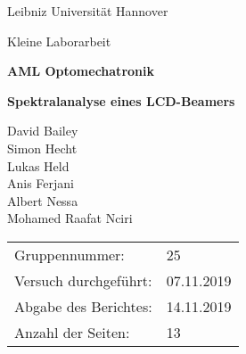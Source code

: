 \begin{titlepage}
	\centering
	{Leibniz Universität Hannover\par}
	{\large Kleine Laborarbeit\par}	

	\vspace{4.5cm}	
	
	{\huge \bf AML Optomechatronik \par}
	{\Huge \bf Spektralanalyse eines LCD-Beamers\par}
	\vspace{0.3cm}
	
	\vspace{1.5cm}
	
	{\Large David Bailey 	\\
			Simon Hecht		\\
			Lukas Held		\\
			Anis Ferjani	\\
			Albert Nessa	\\
			Mohamed Raafat Nciri \par}

	\vfill

	\raggedright

{\Large
\begin{tabular}{ll}
Gruppennummer:& 25 \\
Versuch durchgeführt:& 07.11.2019 \\
Abgabe des Berichtes:& 14.11.2019 \\
Anzahl der Seiten:& 13
\end{tabular}\par}

\end{titlepage}
